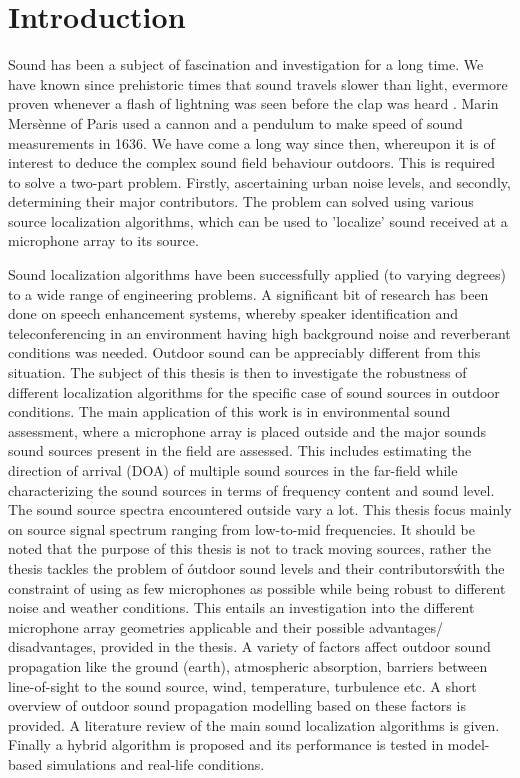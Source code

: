 \section{Introduction}

Sound has been a subject of fascination and investigation for a long time. We have known since prehistoric times that sound travels slower than light, evermore proven whenever a flash of lightning was seen before the clap was heard \cite{ampel1993history}. Marin Mersènne of Paris used a cannon and a pendulum to make speed of sound measurements in 1636. We have come a long way since then, whereupon it is of interest to deduce the complex sound field behaviour outdoors. This is required to solve a two-part problem. Firstly, ascertaining urban noise levels, and secondly, determining their major contributors. The problem can solved using various source localization algorithms, which can be used to 'localize' sound received at a microphone array to its source.

Sound localization algorithms have been successfully applied (to varying degrees) to a wide range of engineering problems. A significant bit of research has been done on speech enhancement systems, whereby speaker identification and teleconferencing in an environment having high background noise and reverberant conditions was needed. Outdoor sound can be appreciably different from this situation. The subject of this thesis is then to investigate the robustness of different localization algorithms for the specific case of sound sources in outdoor conditions. The main application of this work is in environmental sound assessment, where a microphone array is placed outside and the major sounds sound sources present in the field are assessed. This includes estimating the direction of arrival (DOA) of multiple sound sources in the far-field while characterizing the sound sources in terms of frequency content and sound level. The sound source spectra encountered outside vary a lot. This thesis focus mainly on source signal spectrum ranging from low-to-mid frequencies. It should be noted that the purpose of this thesis is not to track moving sources, rather the thesis tackles the problem of \'outdoor sound levels and their contributors\' with the constraint of using as few microphones as possible while being robust to different noise and weather conditions. This entails an investigation into the different microphone array geometries applicable and their possible advantages/ disadvantages, provided in the thesis. A variety of factors affect outdoor sound propagation like the ground (earth), atmospheric absorption, barriers between line-of-sight to the sound source, wind, temperature, turbulence etc. A short overview of outdoor sound propagation modelling based on these factors is provided. A literature review of the main sound localization algorithms is given. Finally a hybrid algorithm is proposed and its performance is tested in model-based simulations and real-life conditions.




